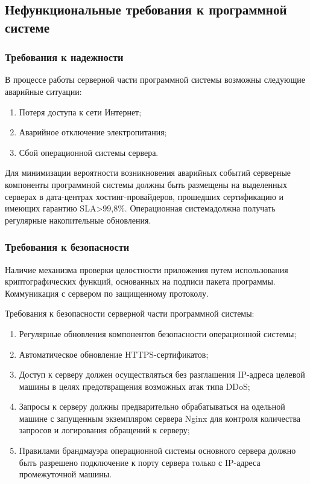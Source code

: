 \subsection{Нефункциональные требования к программной системе}

\subsubsection{Требования к надежности}
В процессе работы серверной части программной системы возможны следующие аварийные ситуации:
\begin{enumerate}
\item Потеря доступа к сети Интернет;
\item Аварийное отключение электропитания;
\item Сбой операционной системы сервера.
\end{enumerate}

Для минимизации вероятности возникновения аварийных событий серверные компоненты программной системы должны быть размещены на выделенных серверах в дата-центрах хостинг-провайдеров, прошедших сертификацию и имеющих гарантию SLA>99,8\%. Операционная системадолжна получать регулярные накопительные обновления.

\subsubsection{Требования к безопасности}
Наличие механизма проверки целостности приложения путем использования криптографических функций, основанных на подписи пакета программы. Коммуникация с сервером по защищенному протоколу.

Требования к безопасности серверной части программной системы:
\begin{enumerate}
\item Регулярные обновления компонентов безопасности операционной системы;
\item Автоматическое обновление HTTPS-сертификатов;
\item Доступ к серверу должен осуществляться без разглашения IP-адреса целевой машины в целях предотвращения возможных атак типа DDoS;
\item Запросы к серверу должны предварительно обрабатываться на одельной машине с запущенным экземпляром сервера Nginx для контроля количества запросов и логирования обращений к серверу;
\item Правилами брандмауэра операционной системы основного сервера должно быть разрешено подключение к порту сервера только с IP-адреса промежуточной машины.
\end{enumerate}

